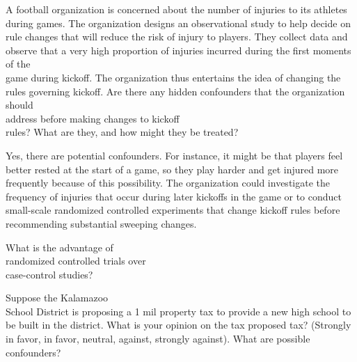 \documentclass[11pt]{book}\usepackage[]{graphicx}\usepackage[]{color}
\begin{document}
\begin{exercises}
  \begin{exercise} %

A football organization is  concerned about the number of injuries to its athletes during games. The organization designs an observational study to help decide on rule changes that will reduce the risk of injury to players. They collect data and observe that a very high proportion of injuries incurred during the first moments of the \\ game during kickoff. The organization thus entertains the idea of changing the rules governing kickoff. Are there any hidden confounders that the organization should \\ address before making changes to  kickoff \\ rules? What are they, and how might they be treated?

	\end{exercise}
	\begin{solution}  %

Yes, there are potential confounders. For instance, it might be that players feel better rested at the start of a game, so they play harder and get injured more frequently because of this possibility. The organization could investigate the frequency of injuries that occur during later kickoffs in the game or to conduct small-scale randomized controlled experiments that change kickoff rules before recommending substantial sweeping changes.

	\end{solution}

	  \begin{exercise} %

What is the advantage of \\ randomized controlled trials over \\ case-control studies?

  \end{exercise}

	  \begin{exercise} %

Suppose the Kalamazoo \\ School District is proposing a 1 mil property tax to provide a new high school to be built in the district.  What is your opinion on the tax proposed tax?  (Strongly in favor, in favor, neutral, against, strongly against).  What are possible confounders?

  \end{exercise}

  

\end{exercises}
\end{document}
